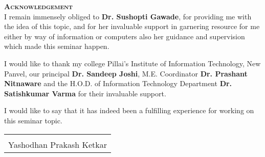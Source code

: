{\centering \bf \LARGE \scshape
Acknowledgement \\
}
\vspace{1em} \noindent
I remain immensely obliged to \textbf{Dr. Sushopti Gawade}, for providing me with the idea of this topic, and for her invaluable support in garnering resource for me either by way of information or computers also her guidance and supervision which made this seminar happen.

\noindent
I would like to thank my college Pillai's Institute of Information Technology, New Panvel, our principal \textbf{Dr. Sandeep Joshi}, M.E. Coordinator \textbf{Dr. Prashant Nitnaware} and the H.O.D. of Information Technology Department \textbf{Dr. Satishkumar Varma} for their invaluable support.

\noindent
I would like to say that it has indeed been a fulfilling experience for working on this seminar topic.

\vspace{7.5em}
\begin{flushright}
  \begin{tabular}{c}
    \hline                   \\
    Yashodhan Prakash Ketkar \\
  \end{tabular}
\end{flushright}